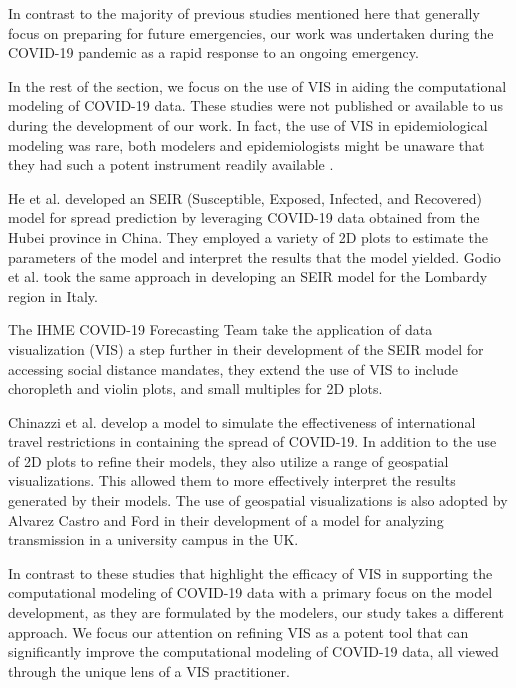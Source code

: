 In contrast to the majority of previous studies mentioned here that generally focus on preparing for future emergencies, our work was undertaken during the COVID-19 pandemic as a rapid response to an ongoing emergency.


In the rest of the section, we focus on the use of \ac{VIS} in aiding the computational modeling of COVID-19 data. These studies were not published or available to us during the development of our work. In fact, the use of VIS in epidemiological modeling was rare, both modelers and epidemiologists might be unaware that they had such a potent instrument readily available \cite{chen2022RAMPVIS}.

He et al. \cite{he2020SEIR} developed an SEIR (Susceptible, Exposed, Infected, and Recovered) model for spread prediction by leveraging COVID-19 data obtained from the Hubei province in China. They employed a variety of 2D plots to estimate the parameters of the model and interpret the results that the model yielded. Godio et al. \cite{godio2020SEIR} took the same approach in developing an SEIR model for the Lombardy region in Italy.

The IHME COVID-19 Forecasting Team \cite{ihmecovid-19forecastingteam2021Modeling} take the application of data visualization (VIS) a step further in their development of the SEIR model for accessing social distance mandates, they extend the use of \ac{VIS} to include choropleth and violin plots, and small multiples for 2D plots.

Chinazzi et al. \cite{chinazzi2020Effect} develop a model to simulate the effectiveness of international travel restrictions in containing the spread of COVID-19. In addition to the use of 2D plots to refine their models, they also utilize a range of geospatial visualizations. This allowed them to more effectively interpret the results generated by their models. The use of geospatial visualizations is also adopted by Alvarez Castro and Ford \cite{alvarezcastro20213D} in their development of a model for analyzing transmission in a university campus in the UK.

In contrast to these studies that highlight the efficacy of \ac{VIS} in supporting the computational modeling of COVID-19 data with a primary focus on the model development, as they are formulated by the modelers, our study takes a different approach. We focus our attention on refining \ac{VIS} as a potent tool that can significantly improve the computational modeling of COVID-19 data, all viewed through the unique lens of a \ac{VIS} practitioner.
